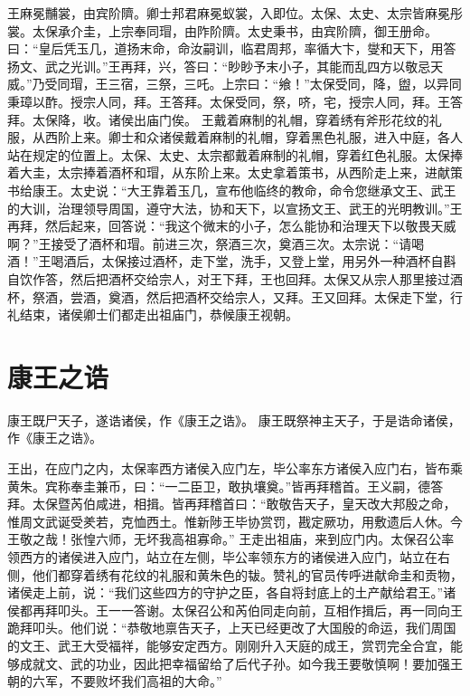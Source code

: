 \documentclass[a4paper,12pt,UTF8,twoside]{ctexbook}
\begin{document}
王麻冕黼裳，由宾阶隮。卿士邦君麻冕蚁裳，入即位。太保、太史、太宗皆麻冕彤裳。太保承介圭，上宗奉同瑁，由阼阶隮。太史秉书，由宾阶隮，御王册命。曰：“皇后凭玉几，道扬末命，命汝嗣训，临君周邦，率循大卞，燮和天下，用答扬文、武之光训。”王再拜，兴，答曰：“眇眇予末小子，其能而乱四方以敬忌天威。”乃受同瑁，王三宿，三祭，三吒。上宗曰：“飨！”太保受同，降，盥，以异同秉璋以酢。授宗人同，拜。王答拜。太保受同，祭，哜，宅，授宗人同，拜。王答拜。太保降，收。诸侯出庙门俟。
王戴着麻制的礼帽，穿着绣有斧形花纹的礼服，从西阶上来。卿士和众诸侯戴着麻制的礼帽，穿着黑色礼服，进入中庭，各人站在规定的位置上。太保、太史、太宗都戴着麻制的礼帽，穿着红色礼服。太保捧着大圭，太宗捧着酒杯和瑁，从东阶上来。太史拿着策书，从西阶走上来，进献策书给康王。太史说：“大王靠着玉几，宣布他临终的教命，命令您继承文王、武王的大训，治理领导周国，遵守大法，协和天下，以宣扬文王、武王的光明教训。”王再拜，然后起来，回答说：“我这个微末的小子，怎么能协和治理天下以敬畏天威啊？”王接受了酒杯和瑁。前进三次，祭酒三次，奠酒三次。太宗说：“请喝酒！”王喝酒后，太保接过酒杯，走下堂，洗手，又登上堂，用另外一种酒杯自斟自饮作答，然后把酒杯交给宗人，对王下拜，王也回拜。太保又从宗人那里接过酒杯，祭酒，尝酒，奠酒，然后把酒杯交给宗人，又拜。王又回拜。太保走下堂，行礼结束，诸侯卿士们都走出祖庙门，恭候康王视朝。

\chapter{康王之诰}

康王既尸天子，遂诰诸侯，作《康王之诰》。
康王既祭神主天子，于是诰命诸侯，作《康王之诰》。

王出，在应门之内，太保率西方诸侯入应门左，毕公率东方诸侯入应门右，皆布乘黄朱。宾称奉圭兼币，曰：“一二臣卫，敢执壤奠。”皆再拜稽首。王义嗣，德答拜。太保暨芮伯咸进，相揖。皆再拜稽首曰：“敢敬告天子，皇天改大邦殷之命，惟周文武诞受羑若，克恤西土。惟新陟王毕协赏罚，戡定厥功，用敷遗后人休。今王敬之哉！张惶六师，无坏我高祖寡命。”
王走出祖庙，来到应门内。太保召公率领西方的诸侯进入应门，站立在左侧，毕公率领东方的诸侯进入应门，站立在右侧，他们都穿着绣有花纹的礼服和黄朱色的韨。赞礼的官员传呼进献命圭和贡物，诸侯走上前，说：“我们这些四方的守护之臣，各自将封底上的土产献给君王。”诸侯都再拜叩头。王一一答谢。太保召公和芮伯同走向前，互相作揖后，再一同向王跪拜叩头。他们说：“恭敬地禀告天子，上天已经更改了大国殷的命运，我们周国的文王、武王大受福祥，能够安定西方。刚刚升入天庭的成王，赏罚完全合宜，能够成就文、武的功业，因此把幸福留给了后代子孙。如今我王要敬慎啊！要加强王朝的六军，不要败坏我们高祖的大命。”
\end{document}
